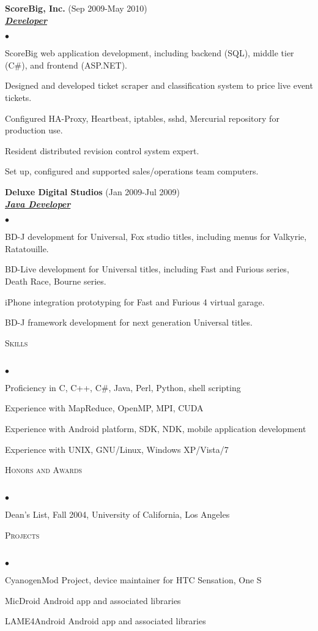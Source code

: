 \documentclass{article}
\newcommand{\lineunder}{\vspace*{-8pt} \\ \hspace*{-18pt} \hrulefill \\}
\newcommand{\header}[1]{{\hspace*{-15pt}\vspace*{6pt} \textsc{#1}} \vspace*{-6pt} \lineunder}
\newcommand{\employer}[3]{{ \textbf{#1} (#2)\\ \underline{\textbf{\emph{#3}}}\\  }}
\newenvironment{achievements}{\begin{list}{$\bullet$}{\topsep 0pt \itemsep -2pt}}{\vspace*{4pt}\end{list}}
\begin{document}
\employer{ScoreBig, Inc.}{Sep 2009-May 2010}{Developer}
  \begin{achievements}
    \item ScoreBig web application development, including backend (SQL), middle tier (C\#), and frontend (ASP.NET).
    \item Designed and developed ticket scraper and classification system to price live event tickets.
    \item Configured HA-Proxy, Heartbeat, iptables, sshd, Mercurial repository for production use.
    \item Resident distributed revision control system expert.
    \item Set up, configured and supported sales/operations team computers.
  \end{achievements}

\employer{Deluxe Digital Studios}{Jan 2009-Jul 2009}{Java Developer}
  \begin{achievements}
    \item BD-J development for Universal, Fox studio titles, including menus for Valkyrie, Ratatouille.
    \item BD-Live development for Universal titles, including Fast and Furious series, Death Race, Bourne series.
    \item iPhone integration prototyping for Fast and Furious 4 virtual garage.
    \item BD-J framework development for next generation Universal titles.
  \end{achievements}

\header{Skills}
  \begin{achievements}
    \item Proficiency in C, C++, C\#, Java, Perl, Python, shell scripting
    \item Experience with MapReduce, OpenMP, MPI, CUDA
    \item Experience with Android platform, SDK, NDK, mobile application development
    \item Experience with UNIX, GNU/Linux, Windows XP/Vista/7
  \end{achievements}

\header{Honors and Awards}
  \begin{achievements}
    \item Dean's List, Fall 2004, University of California, Los Angeles
  \end{achievements}

\header{Projects}
  \begin{achievements}
    \item CyanogenMod Project, device maintainer for HTC Sensation, One S
    \item MicDroid Android app and associated libraries
    \item LAME4Android Android app and associated libraries
  \end{achievements}
\end{document}
